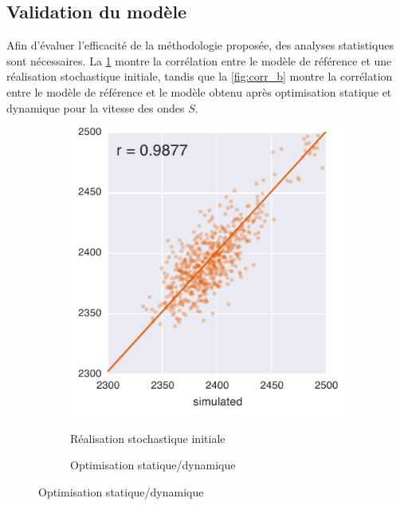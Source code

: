 \subsection{Validation du modèle}
Afin d'évaluer l'efficacité de la méthodologie proposée, des analyses
statistiques sont nécessaires. La \cref{fig:corr_a} montre la corrélation entre
le modèle de référence et une réalisation stochastique initiale, tandis que la
\cref{fig:corr_b} montre la corrélation entre le modèle de référence et le
modèle obtenu après optimisation statique et dynamique pour la vitesse des ondes $S$.
\begin{figure}[!ht]
        \centering
        \begin{subfigure}[b]{0.4\textwidth}
                \caption{Réalisation stochastique initiale}
                \includegraphics[width=\textwidth]{fig/corr_a.pdf}
                \label{fig:corr_a}
        \end{subfigure}%
        \begin{subfigure}[b]{0.4\textwidth}
                \caption{Optimisation statique/dynamique}

\end{subfigure}
\end{figure}
